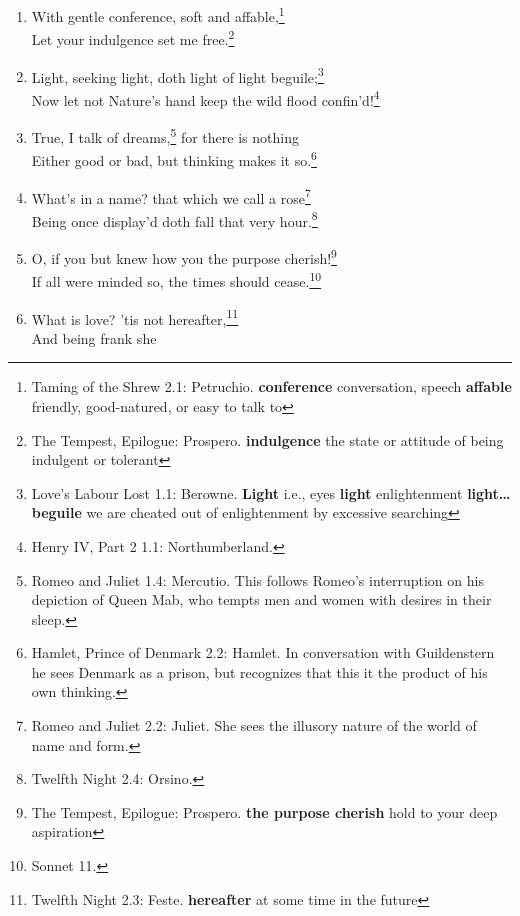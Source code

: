 \documentclass[17pt,twoside]{extarticle}
\begin{document}
\begin{enumerate}
  little moment---\footnote{Sonnet 15.}\\Pray you, tread softly, that
  the blind mole may not hear a foot fall.\footnote{The Tempest 4.1:
    Caliban. \textbf{mole} a small burrowing mammal with dark velvety
    fur, a long muzzle, and very small eyes, feeding mainly on worms,
    grubs, and other invertebrates. \textbf{foot fall} footstep}
\item
  With gentle conference, soft and affable,\footnote{Taming of the Shrew
    2.1: Petruchio. \textbf{conference} conversation, speech
    \textbf{affable} friendly, good-natured, or easy to talk to}\\Let
  your indulgence set me free.\footnote{The Tempest, Epilogue: Prospero.
    \textbf{indulgence} the state or attitude of being indulgent or
    tolerant}
\item
  Light, seeking light, doth light of light beguile;\footnote{Love's
    Labour Lost 1.1: Berowne. \textbf{Light} i.e., eyes \textbf{light}
    enlightenment \textbf{light\ldots{}beguile} we are cheated out of
    enlightenment by excessive searching}\\Now let not Nature's hand
  keep the wild flood confin'd!\footnote{Henry IV, Part 2 1.1:
    Northumberland.}
\item
  True, I talk of dreams,\footnote{Romeo and Juliet 1.4: Mercutio. This
    follows Romeo's interruption on his depiction of Queen Mab, who
    tempts men and women with desires in their sleep.} for there is
  nothing\\Either good or bad, but thinking makes it so.\footnote{Hamlet,
    Prince of Denmark 2.2: Hamlet. In conversation with Guildenstern he
    sees Denmark as a prison, but recognizes that this it the product of
    his own thinking.}
\item
  What's in a name? that which we call a rose\footnote{Romeo and Juliet
    2.2: Juliet. She sees the illusory nature of the world of name and
    form.}\\Being once display'd doth fall that very hour.\footnote{Twelfth
    Night 2.4: Orsino.}
\item
  O, if you but knew how you the purpose cherish!\footnote{The Tempest,
    Epilogue: Prospero. \textbf{the purpose cherish} hold to your deep
    aspiration}\\If all were minded so, the times should
  cease.\footnote{Sonnet 11.}
\item
  What is love? 'tis not hereafter,\footnote{Twelfth Night 2.3: Feste.
    \textbf{hereafter} at some time in the future}\\And being frank she

\end{enumerate}
\end{document}
